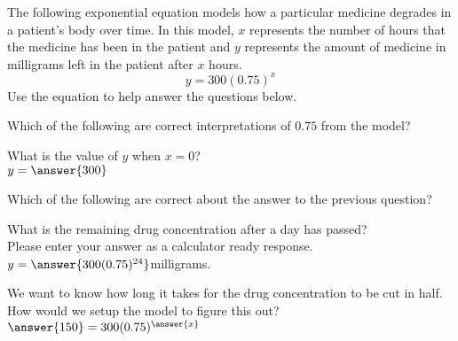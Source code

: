 \documentclass{ximera}
\author{David Kish}
\begin{document}
The following exponential equation models how a particular medicine degrades in a patient's body over time. In this model, $x$ represents the number of hours that the medicine has been in the patient and $y$ represents the amount of medicine in milligrams left in the patient after $x$ hours.
\[
y=300(0.75)^x
\]
Use the equation to help answer the questions below.

\begin{exercise}
Which of the following are correct interpretations of $0.75$ from the model?
  \begin{selectAll}
  \end{selectAll}
\end{exercise}
\begin{exercise}
What is the value of $y$ when $x=0$?\\
$y=\answer{300}$ 
\end{exercise}
\begin{exercise}
Which of the following are correct about the answer to the previous question?
  \begin{selectAll}
  \end{selectAll}
\end{exercise}
\begin{exercise}
What is the remaining drug concentration after a day has passed?\\
Please enter your answer as a calculator ready response.\\
$y=\answer{300(0.75)^{24}}$milligrams.
\end{exercise}
\begin{exercise}
We want to know how long it takes for the drug concentration to be cut in half. How would we setup the model to figure this out?\\
$\answer{150}=300(0.75)^{\answer{x}}$
\end{exercise}
\end{document}
